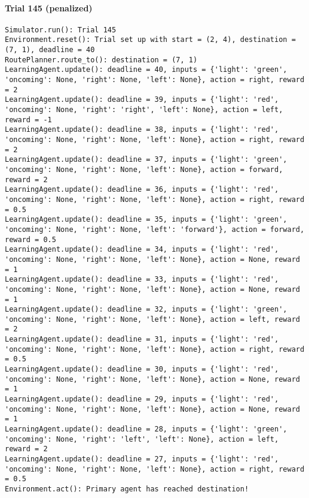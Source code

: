 \documentclass{article}
\begin{document}
\paragraph{Trial 145 (penalized)}\label{trial-145-penalized}

\begin{verbatim}
Simulator.run(): Trial 145
Environment.reset(): Trial set up with start = (2, 4), destination = (7, 1), deadline = 40
RoutePlanner.route_to(): destination = (7, 1)
LearningAgent.update(): deadline = 40, inputs = {'light': 'green', 'oncoming': None, 'right': None, 'left': None}, action = right, reward = 2
LearningAgent.update(): deadline = 39, inputs = {'light': 'red', 'oncoming': None, 'right': 'right', 'left': None}, action = left, reward = -1
LearningAgent.update(): deadline = 38, inputs = {'light': 'red', 'oncoming': None, 'right': None, 'left': None}, action = right, reward = 2
LearningAgent.update(): deadline = 37, inputs = {'light': 'green', 'oncoming': None, 'right': None, 'left': None}, action = forward, reward = 2
LearningAgent.update(): deadline = 36, inputs = {'light': 'red', 'oncoming': None, 'right': None, 'left': None}, action = right, reward = 0.5
LearningAgent.update(): deadline = 35, inputs = {'light': 'green', 'oncoming': None, 'right': None, 'left': 'forward'}, action = forward, reward = 0.5
LearningAgent.update(): deadline = 34, inputs = {'light': 'red', 'oncoming': None, 'right': None, 'left': None}, action = None, reward = 1
LearningAgent.update(): deadline = 33, inputs = {'light': 'red', 'oncoming': None, 'right': None, 'left': None}, action = None, reward = 1
LearningAgent.update(): deadline = 32, inputs = {'light': 'green', 'oncoming': None, 'right': None, 'left': None}, action = left, reward = 2
LearningAgent.update(): deadline = 31, inputs = {'light': 'red', 'oncoming': None, 'right': None, 'left': None}, action = right, reward = 0.5
LearningAgent.update(): deadline = 30, inputs = {'light': 'red', 'oncoming': None, 'right': None, 'left': None}, action = None, reward = 1
LearningAgent.update(): deadline = 29, inputs = {'light': 'red', 'oncoming': None, 'right': None, 'left': None}, action = None, reward = 1
LearningAgent.update(): deadline = 28, inputs = {'light': 'green', 'oncoming': None, 'right': 'left', 'left': None}, action = left, reward = 2
LearningAgent.update(): deadline = 27, inputs = {'light': 'red', 'oncoming': None, 'right': None, 'left': None}, action = right, reward = 0.5
Environment.act(): Primary agent has reached destination!
\end{verbatim}
\end{document}
